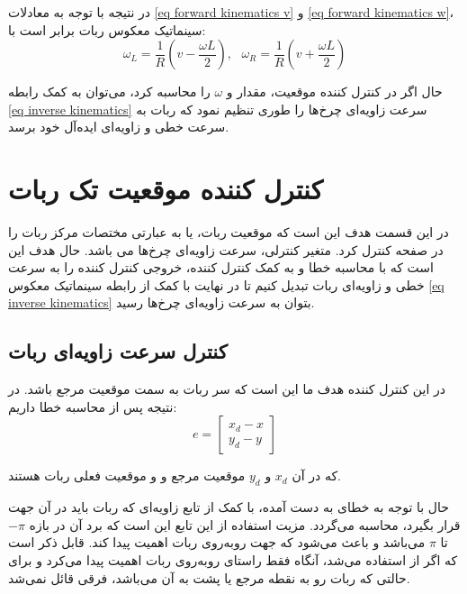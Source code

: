 در نتیجه با توجه به معادلات \ref{eq forward kinematics v} و \ref{eq forward kinematics w}، سینماتیک معکوس ربات برابر است با:
\begin{equation} \label{eq inverse kinematics}
\omega_L = \frac{1}{R}(v - \frac{\omega L}{2}),~~~  \omega_R = \frac{1}{R}(v + \frac{\omega L}{2})
\end{equation}

حال اگر در کنترل کننده موقعیت، مقدار  و $\omega$ را محاسبه کرد، می‌توان به کمک رابطه \ref{eq inverse kinematics} سرعت زاویه‌ای چرخ‌ها را طوری تنظیم نمود که ربات به سرعت خطی و زاویه‌ای ایده‌آل خود برسد.

\section{کنترل کننده موقعیت تک ربات}

در این قسمت هدف این است که موقعیت ربات، یا به عبارتی مختصات مرکز ربات را در صفحه  کنترل کرد. متغیر کنترلی، سرعت زاویه‌ای چرخ‌ها می باشد. حال هدف این است که با محاسبه خطا و به کمک کنترل کننده، خروجی کنترل کننده را به سرعت خطی و زاویه‌ای ربات تبدیل کنیم تا در نهایت با کمک از رابطه سینماتیک معکوس \ref{eq inverse kinematics} بتوان به سرعت زاویه‌ای چرخ‌ها رسید.

\subsection{کنترل سرعت زاویه‌ای ربات}
در این کنترل ‌کننده هدف ما این است که سر ربات به سمت موقعیت مرجع باشد. در نتیجه پس از محاسبه خطا داریم:
\begin{equation}
e = 
\begin{bmatrix}
x_d - x \\
y_d - y
\end{bmatrix}
\end{equation}

که در آن $x_d$ و $y_d$ موقعیت مرجع و  و  موقعیت فعلی ربات هستند.

حال با توجه به خطای به دست آمده، با کمک از تابع  زاویه‌ای که ربات باید در آن جهت قرار بگیرد، محاسبه می‌گردد. مزیت استفاده از این تابع این است که برد آن در بازه
$-\pi$
تا
$\pi$
می‌باشد و باعث می‌شود که جهت رو‌به‌روی ربات اهمیت پیدا کند. قابل ذکر است که اگر از استفاده می‌شد، آنگاه فقط راستای رو‌به‌روی ربات اهمیت پیدا می‌کرد و برای حالتی که ربات رو به نقطه مرجع یا پشت به آن می‌باشد، فرقی قائل نمی‌شد.

